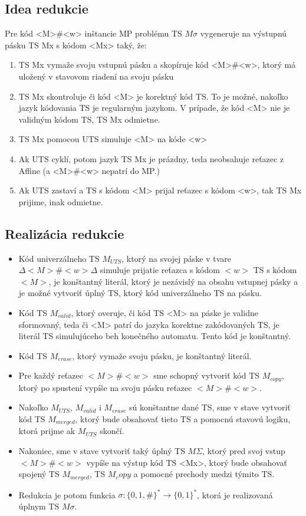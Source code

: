 \documentclass[10pt]{article}
\begin{document}
\subsection*{Idea redukcie}
Pre kód <M>\#<w> inštancie MP problému TS $M\sigma$ vygeneruje na výstupnú pásku TS Mx s kódom <Mx> taký, že:
\begin{enumerate}
    \item TS Mx vymaže svoju vstupnú pásku a skopíruje kód <M>\#<w>, ktorý má uložený v stavovom
        riadení na svoju pásku
    \item TS Mx skontroluje či kód <M> je korektný kód TS. To je možné, nakoľko jazyk kódovania TS
        je regularným jazykom. V prípade, že kód <M> nie je validným kódom TS, TS Mx odmietne. 
    \item TS Mx pomocou UTS simuluje <M> na kóde <w>
    \item Ak UTS cyklí, potom jazyk TS Mx je prázdny, teda neobsahuje reťazec z Affine (a
        <M>\#<w> nepatrí do MP.)
    \item Ak UTS zastaví a TS s kódom <M> prijal reťazec s kódom <w>, tak TS Mx prijime, inak odmietne.
\end{enumerate}

\subsection*{Realizácia redukcie}
\begin{itemize}
    \item Kód univerzálneho TS $M_{UTS}$, ktorý na svojej páske v tvare $\Delta <M>\#<w> \Delta$ simuluje
        prijatie reťazca s kódom $<w>$ TS s kódom $<M>$, je konštantný literál, ktorý je nezávislý
        na obsahu vstupnej pásky a je možné vytvoriť úplný TS, ktorý kód univerzálneho TS na pásku. 
    \item Kód TS $M_{valid}$, ktorý overuje, či kód TS <M> na páske je validne sformovaný, teda či <M> patrí do jazyka
        korektne zakódovaných TS, je literál TS simulujúceho beh konečného automatu. Tento kód je
        konštantný.
    \item Kód TS $M_{erase}$, ktorý vymaže svoju pásku, je konštantný literál. 
    \item Pre každý reťazec $<M>\#<w>$ sme schopný vytvoriť kód TS $M_{copy}$, ktorý po spustení vypíše na svoju
        pásku reťazec $<M>\#<w>$. 
    \item Nakoľko $M_{UTS}$, $M_{valid}$ i $M_{erase}$ sú konštantne dané TS, sme v stave vytvoriť
        kód TS $M_{merged}$, ktorý bude obsahovať tieto TS a pomocnú stavovú logiku, ktorá prijme ak $M_{UTS}$
        skončí.
    \item Nakoniec, sme v stave vytvoriť taký úplný TS $M\Sigma$, ktorý pred svoj vstup $<M>\#<w>$ vypíše na
        výstup kód TS <Mx>, ktorý bude obsahovať spojený TS $M_{merged}$, TS $M_copy$ a pomocné
        prechody medzi týmito TS.
    
    \item Redukcia je potom funkcia $\sigma: \{0,1,\#\}^* \to \{0,1\}^*$, ktorá je realizovaná úplnym
    TS $M\sigma$.
\end{itemize}
\end{document}
